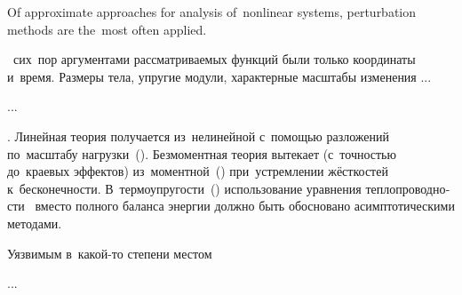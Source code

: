 

\thispagestyle{empty}

\label{chapter:asymptoticperturbationmethods}

{\small
Of approximate approaches for analysis of~nonlinear systems, perturbation methods are the~most often applied.
\par}



\begin{otherlanguage}{russian}

~сих~пор аргументами рассматриваемых функций были только координаты и~время.
Размеры тела, упругие модули, характерные масштабы изменения ...

...

  .
Линейная теория получается из~нелинейной с~помощью разложений по~масштабу нагрузки~().
Безмоментная теория вытекает (с~точностью до~краевых эффектов) из~моментной~() при~устремлении  жёсткостей к~бесконечности.
В~термо\-упругости~() использование уравнения теплопроводности~ вместо полного баланса энергии должно быть обосновано асимпто\-ти\-чес\-кими методами.

Уязвимым в~какой\hbox{-}то степени местом


...



\end{otherlanguage}

